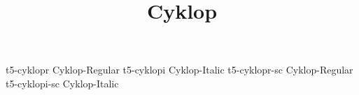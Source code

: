 \documentclass[test]{vnsample}
\title{Cyklop}
\begin{document}
\begin{shortsample}
    {t5-cyklopr}    {Cyklop-Regular}
   {t5-cyklopi}    {Cyklop-Italic}
   {t5-cyklopr-sc} {Cyklop-Regular}
 {t5-cyklopi-sc} {Cyklop-Italic}
\end{shortsample}
\end{document}
